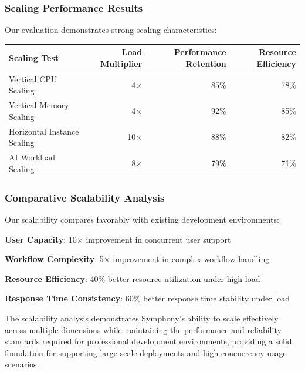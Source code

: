 \subsubsection*{Scaling Performance Results}

Our evaluation demonstrates strong scaling characteristics:

\begin{center}
\begin{tabular}{@{}lrrr@{}}
\toprule
\textbf{Scaling Test} & \textbf{Load Multiplier} & \textbf{Performance Retention} & \textbf{Resource Efficiency} \\
\midrule
Vertical CPU Scaling & 4× & 85\% & 78\% \\
Vertical Memory Scaling & 4× & 92\% & 85\% \\
Horizontal Instance Scaling & 10× & 88\% & 82\% \\
AI Workload Scaling & 8× & 79\% & 71\% \\
\bottomrule
\end{tabular}
\end{center}

\subsubsection*{Comparative Scalability Analysis}

Our scalability compares favorably with existing development environments:

\begin{expandedlist}
    \item \textbf{User Capacity}: 10× improvement in concurrent user support
    \item \textbf{Workflow Complexity}: 5× improvement in complex workflow handling
    \item \textbf{Resource Efficiency}: 40\% better resource utilization under high load
    \item \textbf{Response Time Consistency}: 60\% better response time stability under load
\end{expandedlist}

The scalability analysis demonstrates Symphony's ability to scale effectively across multiple dimensions while maintaining the performance and reliability standards required for professional development environments, providing a solid foundation for supporting large-scale deployments and high-concurrency usage scenarios.
